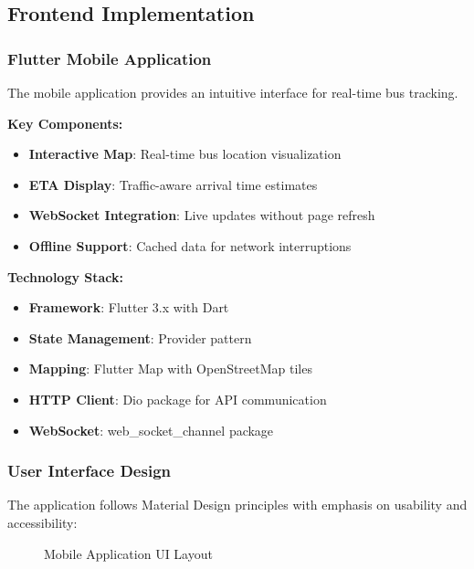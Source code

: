 \documentclass[12pt,a4paper]{article}
\begin{document}
\subsection{Frontend Implementation}

\subsubsection{Flutter Mobile Application}

The mobile application provides an intuitive interface for real-time bus tracking.

\textbf{Key Components:}
\begin{itemize}
    \item \textbf{Interactive Map}: Real-time bus location visualization
    \item \textbf{ETA Display}: Traffic-aware arrival time estimates
    \item \textbf{WebSocket Integration}: Live updates without page refresh
    \item \textbf{Offline Support}: Cached data for network interruptions
\end{itemize}

\textbf{Technology Stack:}
\begin{itemize}
    \item \textbf{Framework}: Flutter 3.x with Dart
    \item \textbf{State Management}: Provider pattern
    \item \textbf{Mapping}: Flutter Map with OpenStreetMap tiles
    \item \textbf{HTTP Client}: Dio package for API communication
    \item \textbf{WebSocket}: web\_socket\_channel package
\end{itemize}

\subsubsection{User Interface Design}

The application follows Material Design principles with emphasis on usability and accessibility:

\begin{figure}[H]
\centering
{}
\caption{Mobile Application UI Layout}
\label{fig:mobile_ui}
\end{figure}
\end{document}
